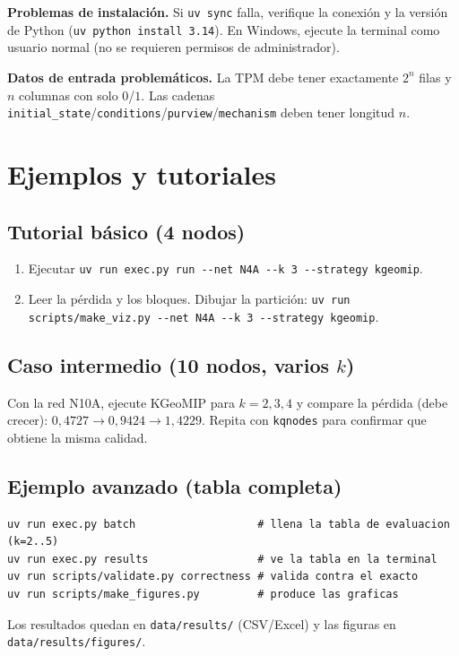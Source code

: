 \documentclass[11pt,letterpaper]{article}
\begin{document}
\noindent\textbf{Problemas de instalación.} Si \texttt{uv sync} falla, verifique
la conexión y la versión de Python (\texttt{uv python install 3.14}). En Windows,
ejecute la terminal como usuario normal (no se requieren permisos de
administrador).

\noindent\textbf{Datos de entrada problemáticos.} La TPM debe tener exactamente
$2^n$ filas y $n$ columnas con solo $0$/$1$. Las cadenas
\texttt{initial\_state}/\texttt{conditions}/\texttt{purview}/\texttt{mechanism}
deben tener longitud $n$.

\section{Ejemplos y tutoriales}

\subsection{Tutorial básico (4 nodos)}
\begin{enumerate}
	\item Ejecutar \texttt{uv run exec.py run -{}-net N4A -{}-k 3 -{}-strategy kgeomip}.
	\item Leer la pérdida y los bloques. Dibujar la partición:
	      \texttt{uv run scripts/make\_viz.py -{}-net N4A -{}-k 3 -{}-strategy kgeomip}.
\end{enumerate}

\subsection{Caso intermedio (10 nodos, varios $k$)}
Con la red N10A, ejecute KGeoMIP para $k=2,3,4$ y compare la pérdida (debe crecer):
$0{,}4727 \to 0{,}9424 \to 1{,}4229$. Repita con \texttt{kqnodes} para confirmar que
obtiene la misma calidad.

\subsection{Ejemplo avanzado (tabla completa)}
\begin{lstlisting}[style=sh]
uv run exec.py batch                   # llena la tabla de evaluacion (k=2..5)
uv run exec.py results                 # ve la tabla en la terminal
uv run scripts/validate.py correctness # valida contra el exacto
uv run scripts/make_figures.py         # produce las graficas
\end{lstlisting}
Los resultados quedan en \texttt{data/results/} (CSV/Excel) y las figuras en
\texttt{data/results/figures/}.
\end{document}
